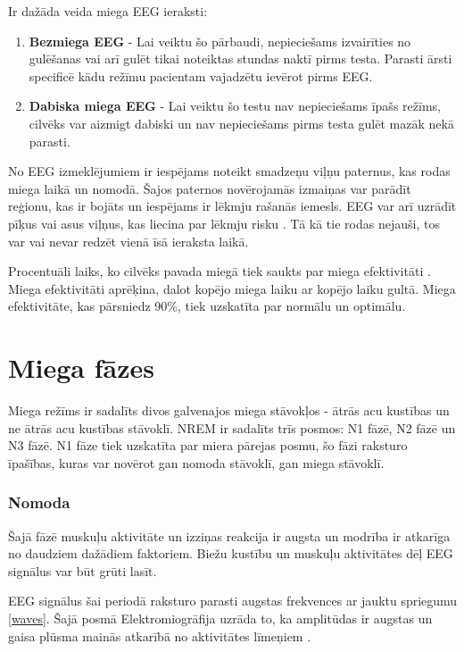 \documentclass[12pt,paper=A4]{report}
\begin{document}
Ir dažāda veida miega EEG ieraksti:

\begin{enumerate}
\item \textbf{Bezmiega EEG} - Lai veiktu šo pārbaudi, nepieciešams izvairīties no gulēšanas vai arī gulēt tikai noteiktas stundas naktī pirms testa. Parasti ārsti specificē kādu režīmu pacientam vajadzētu ievērot pirms EEG.
\item \textbf{Dabiska miega EEG} - Lai veiktu šo testu nav nepieciešams īpašs režīms, cilvēks var aizmigt dabiski un nav nepieciešams pirms testa gulēt mazāk nekā parasti.
\end{enumerate}

No EEG izmeklējumiem ir iespējams noteikt smadzeņu viļņu paternus, kas rodas miega laikā un nomodā. Šajos paternos novērojamās izmaiņas var parādīt reģionu, kas ir bojāts un iespējams ir lēkmju rašanās iemesls. EEG var arī uzrādīt pīķus vai asus viļņus, kas liecina par lēkmju risku \cite{epilepsy}. Tā kā tie rodas nejauši, tos var vai nevar redzēt vienā īsā ieraksta laikā.

Procentuāli laiks, ko cilvēks pavada miegā tiek saukts par miega efektivitāti \cite{SleepStagesSecure}. Miega efektivitāti aprēķina, dalot kopējo miega laiku ar kopējo laiku gultā. Miega efektivitāte, kas pārsniedz 90\%, tiek uzskatīta par normālu un optimālu.


    \section{Miega fāzes}
    
    Miega režīms ir sadalīts divos galvenajos miega stāvokļos - ātrās acu kustības un ne ātrās acu kustības stāvoklī. NREM ir sadalīts trīs posmos: N1 fāzē, N2 fāzē un N3 fāzē. N1 fāze tiek uzskatīta par miera pārejas posmu, šo fāzi raksturo īpašības, kuras var novērot gan nomoda stāvoklī, gan miega stāvoklī. 
    
    \subsubsection{Nomoda}
    
    Šajā fāzē muskuļu aktivitāte un izziņas reakcija ir augsta un modrība ir atkarīga no daudziem dažādiem faktoriem. Biežu kustību un muskuļu aktivitātes dēļ EEG signālus var būt grūti lasīt. 
       
    EEG signālus šai periodā raksturo parasti augstas frekvences ar jauktu spriegumu \ref{waves}. Šajā posmā Elektromiogrāfija uzrāda to, ka amplitūdas ir augstas un gaisa plūsma mainās atkarībā no aktivitātes līmeņiem \cite{SleepStageScoring}.
    
\end{document}
